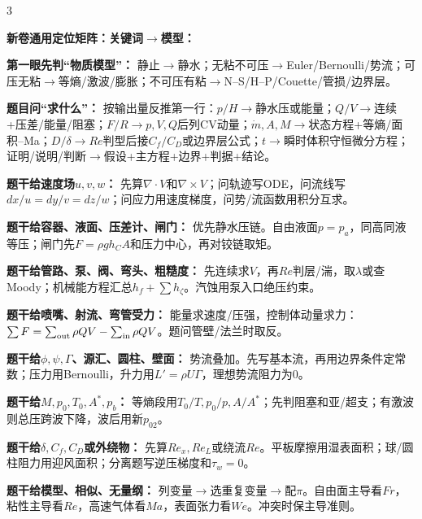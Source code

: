 \documentclass[a4paper]{article}
\newcommand{\sect}[1]{\par{\bfseries\color{Q}#1：}}
\begin{document}
\begin{multicols}{3}
{\sect{新卷通用定位矩阵：关键词$\to$模型}
\sect{第一眼先判“物质模型”}
静止$\to$静水；无粘不可压$\to$Euler/Bernoulli/势流；可压无粘$\to$等熵/激波/膨胀；不可压有粘$\to$N--S/H--P/Couette/管损/边界层。
\sect{题目问“求什么”}
按输出量反推第一行：$p/H\to$静水压或能量；$Q/V\to$连续+压差/能量/阻塞；$F/R\to p,V,Q$后列CV动量；$\dot m,A,M\to$状态方程+等熵/面积--Ma；$D/\delta\to Re$判型后接$C_f/C_D$或边界层公式；$t\to$瞬时体积守恒微分方程；证明/说明/判断$\to$假设+主方程+边界+判据+结论。
\sect{题干给速度场$u,v,w$}
先算$\nabla\cdot V$和$\nabla\times V$；问轨迹写ODE，问流线写$dx/u=dy/v=dz/w$；问应力用速度梯度，问势/流函数用积分互求。
\sect{题干给容器、液面、压差计、闸门}
优先静水压链。自由液面$p=p_a$，同高同液等压；闸门先$F=\rho gh_CA$和压力中心，再对铰链取矩。
\sect{题干给管路、泵、阀、弯头、粗糙度}
先连续求$V$，再$Re$判层/湍，取$\lambda$或查Moody；机械能方程汇总$h_f+\sum h_\zeta$。汽蚀用泵入口绝压约束。
\sect{题干给喷嘴、射流、弯管受力}
能量求速度/压强，控制体动量求力：$\sum F=\sum_{\rm out}\rho QV-\sum_{\rm in}\rho QV$。题问管壁/法兰时取反。
\sect{题干给$\phi,\psi,\Gamma$、源汇、圆柱、壁面}
势流叠加。先写基本流，再用边界条件定常数；压力用Bernoulli，升力用$L'=\rho U\Gamma$，理想势流阻力为0。
\sect{题干给$M,p_0,T_0,A^*,p_b$}
等熵段用$T_0/T,p_0/p,A/A^*$；先判阻塞和亚/超支；有激波则总压跨波下降，波后用新$p_{02}$。
\sect{题干给$\delta,C_f,C_D$或外绕物}
先算$Re_x,Re_L$或绕流$Re$。平板摩擦用湿表面积；球/圆柱阻力用迎风面积；分离题写逆压梯度和$\tau_w=0$。
\sect{题干给模型、相似、无量纲}
列变量$\to$选重复变量$\to$配$\pi$。自由面主导看$Fr$，粘性主导看$Re$，高速气体看$Ma$，表面张力看$We$。冲突时保主导准则。

}
\end{multicols}
\end{document}

